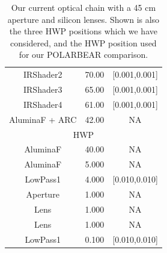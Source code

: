 \documentclass{article}
\theoremstyle{remark}
\begin{document}
\begin{table}
\begin{tabular}{|c|c|c|}
IRShader2	& 70.00  & [0.001,0.001]	\\
IRShader3	& 65.00  & [0.001,0.001]	\\
IRShader4	& 61.00  & [0.001,0.001]	\\
AluminaF + ARC	& 42.00  &  NA			  	\\
\hline
\multicolumn{3}{|c|}{HWP} \\
\hline
AluminaF	& 40.00  &  NA			  	\\
AluminaF	& 5.000  &  NA			  	\\
LowPass1	& 4.000  & [0.010,0.010]	\\
Aperture	& 1.000  & NA	       	\\
Lens		& 1.000  &  NA			  	\\
Lens		& 1.000  &  NA			  	\\
LowPass1	& 0.100  & [0.010,0.010]	\\

\hline
\end{tabular}

\caption{Our current optical chain with a 45 cm aperture and silicon lenses.
Shown is also the three HWP positions which we have considered, and the HWP position used for our POLARBEAR comparison.
}

\label{table:SO_OpticalChain}
\end{table}
\end{document}
